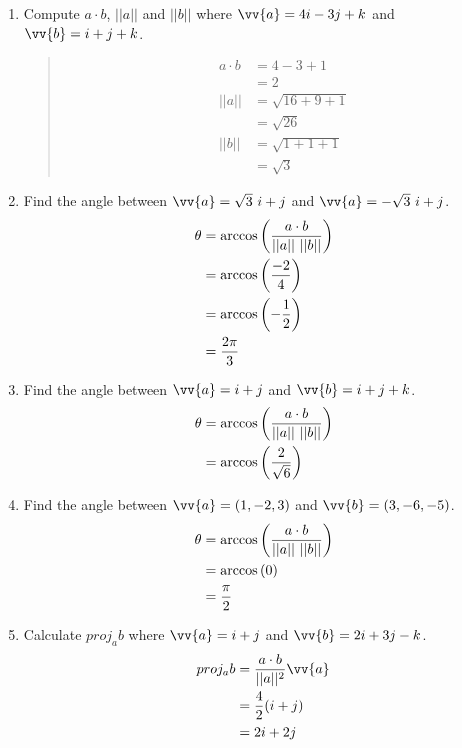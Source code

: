 \documentclass{hw}
\begin{document}

\begin{enumerate}
\item Compute $a\cdot b$, $||a||$ and $||b||$ where $\vv{a} = 4i -3j + k$ and $\vv{b}=i+j+k$.
\begin{quote}
\begin{align*}
a\cdot b &= 4 - 3 + 1\\
&= 2\\
||a|| &= \sqrt{16+9+1}\\
&= \sqrt{26}\\
||b|| &= \sqrt{1+1+1}\\
&= \sqrt{3}
\end{align*}
\end{quote}

\item Find the angle between $\vv{a} = \sqrt{3}\ i + j$ and $\vv{a} = -\sqrt{3}\ i + j$.
\begin{align*}
\theta &= \arccos{\left({a\cdot b \over ||a||\ ||b||}\right)}\\
&= \arccos{\left({-2\over 4}\right)}\\
&= \arccos{\left(-{1\over 2}\right)}\\
&= {2\pi \over 3}
\end{align*}

\item Find the angle between $\vv{a} = i + j$ and $\vv{b} = i + j + k$.
\begin{align*}
\theta &= \arccos{\left({a\cdot b \over ||a||\ ||b||}\right)}\\
&= \arccos{\left({2 \over \sqrt{6}}\right)}
\end{align*}

\item Find the angle between $\vv{a} = (1,-2,3)$ and $\vv{b} = (3,-6,-5)$.
\begin{align*}
\theta &= \arccos{\left({a\cdot b \over ||a||\ ||b||}\right)}\\
&= \arccos{(0)}\\
&= {\pi \over 2}
\end{align*}

\item Calculate $proj_{a}b$ where $\vv{a} = i + j$ and $\vv{b} = 2i + 3j - k$.
\begin{align*}
proj_{a}b &= {a\cdot b \over ||a||^{2}}\vv{a}\\
&= {4\over 2}(i + j)\\
&= 2i + 2j
\end{align*}


\end{enumerate}
\end{document}
